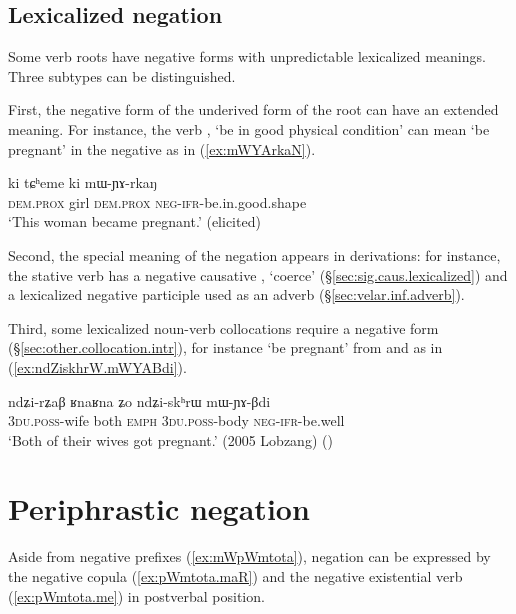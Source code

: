 \subsection{Lexicalized negation} \label{sec:lexicalized.negative}
Some verb roots have negative forms with unpredictable lexicalized meanings. Three subtypes can be distinguished.

First, the negative form of the underived form of the root can have an extended meaning. For instance, the verb , `be in good physical condition' can mean `be pregnant' in the negative as in (\ref{ex:mWYArkaN}).

\begin{exe}
	\ex \label{ex:mWYArkaN}
	\gll ki tɕʰeme ki mɯ-ɲɤ-rkaŋ \\
	\textsc{dem}.\textsc{prox} girl \textsc{dem}.\textsc{prox} \textsc{neg}-\textsc{ifr}-be.in.good.shape \\
	\glt `This woman became pregnant.' (elicited)
\end{exe}

Second, the special meaning of the negation appears in derivations: for instance, the stative verb  has a negative causative , `coerce'  (§\ref{sec:sig.caus.lexicalized}) and a lexicalized negative participle  used as an adverb (§\ref{sec:velar.inf.adverb}). 


Third, some lexicalized noun-verb collocations require a negative form (§\ref{sec:other.collocation.intr}), for instance  `be pregnant' from  and  as in (\ref{ex:ndZiskhrW.mWYABdi}).

\begin{exe}
	\ex \label{ex:ndZiskhrW.mWYABdi}
	\gll ndʑi-rʑaβ ʁnaʁna ʑo ndʑi-skʰrɯ mɯ-ɲɤ-βdi  \\
	\textsc{3du}.\textsc{poss}-wife both \textsc{emph} \textsc{3du}.\textsc{poss}-body \textsc{neg}-\textsc{ifr}-be.well \\
	\glt `Both of their wives got pregnant.' (2005 Lobzang) 
()
\end{exe}  

\section{Periphrastic negation} \label{sec:periphrastic.negation}
Aside from negative prefixes (\ref{ex:mWpWmtota}), negation can be expressed by the negative copula  (\ref{ex:pWmtota.maR}) and the negative existential verb  (\ref{ex:pWmtota.me}) in postverbal position. 

